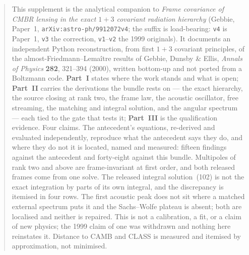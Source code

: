 \begin{abstract}
\noindent
This supplement is the analytical companion to \emph{Frame covariance of CMBR
lensing in the exact $1+3$ covariant radiation hierarchy} (Gebbie, Paper~1,
\texttt{arXiv:astro-ph/9912072v4}; the suffix is load-bearing: \texttt{v4} is
Paper~1, \texttt{v3} the correction, \texttt{v1}--\texttt{v2} the 1999
originals). It documents an independent Python reconstruction, from first
$1+3$ covariant principles, of the almost-Friedmann--Lema\^itre results of
Gebbie, Dunsby \& Ellis, \emph{Annals of Physics} \textbf{282}, 321--394
(2000), written bottom-up and not ported from a Boltzmann code.
\textbf{Part~I} states where the work stands and what is open; \textbf{Part~II}
carries the derivations the bundle rests on --- the exact hierarchy, the source
closing at rank two, the frame law, the acoustic oscillator, free streaming,
the matching and integral solution, and the angular spectrum --- each tied to
the gate that tests it; \textbf{Part~III} is the qualification evidence. Four
claims. The antecedent's equations, re-derived and evaluated independently,
reproduce what the antecedent says they do, and where they do not it is
located, named and measured: fifteen findings against the antecedent and
forty-eight against this bundle. Multipoles of rank two and above are
frame-invariant at first order, and both released frames come from one solve.
The released integral solution~(102) is not the exact integration by parts of
its own integral, and the discrepancy is itemised in four rows. The first
acoustic peak does not sit where a matched external spectrum puts it and the
Sachs--Wolfe plateau is absent; both are localised and neither is repaired.
This is not a calibration, a fit, or a claim of new physics; the 1999 claim of
one was withdrawn and nothing here reinstates it. Distance to CAMB and CLASS is
measured and itemised by approximation, not minimised.
\end{abstract}
